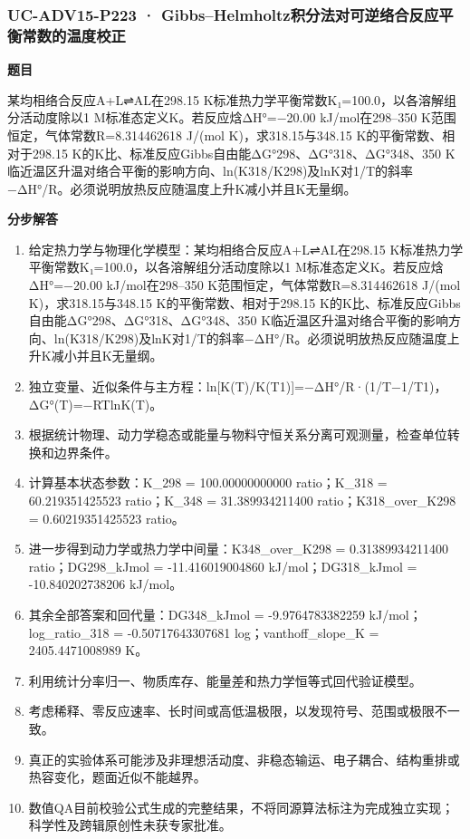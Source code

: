 \documentclass[UTF8,11pt,a4paper]{ctexart}
\begin{document}
\subsubsection*{UC-ADV15-P223 · Gibbs–Helmholtz积分法对可逆络合反应平衡常数的温度校正}
\noindent\textbf{题目}\par
某均相络合反应A+L⇌AL在298.15 K标准热力学平衡常数K₁=100.0，以各溶解组分活动度除以1 M标准态定义K。若反应焓ΔH°=−20.00 kJ/mol在298–350 K范围恒定，气体常数R=8.314462618 J/(mol K)，求318.15与348.15 K的平衡常数、相对于298.15 K的K比、标准反应Gibbs自由能ΔG°298、ΔG°318、ΔG°348、350 K临近温区升温对络合平衡的影响方向、ln(K318/K298)及lnK对1/T的斜率−ΔH°/R。必须说明放热反应随温度上升K减小并且K无量纲。\par
\medskip\noindent\textbf{分步解答}
\begin{enumerate}
\item 给定热力学与物理化学模型：某均相络合反应A+L⇌AL在298.15 K标准热力学平衡常数K₁=100.0，以各溶解组分活动度除以1 M标准态定义K。若反应焓ΔH°=−20.00 kJ/mol在298–350 K范围恒定，气体常数R=8.314462618 J/(mol K)，求318.15与348.15 K的平衡常数、相对于298.15 K的K比、标准反应Gibbs自由能ΔG°298、ΔG°318、ΔG°348、350 K临近温区升温对络合平衡的影响方向、ln(K318/K298)及lnK对1/T的斜率−ΔH°/R。必须说明放热反应随温度上升K减小并且K无量纲。
\item 独立变量、近似条件与主方程：ln[K(T)/K(T1)]=−ΔH°/R·(1/T−1/T1)，ΔG°(T)=−RTlnK(T)。
\item 根据统计物理、动力学稳态或能量与物料守恒关系分离可观测量，检查单位转换和边界条件。
\item 计算基本状态参数：K\_298 = 100.00000000000 ratio；K\_318 = 60.219351425523 ratio；K\_348 = 31.389934211400 ratio；K318\_over\_K298 = 0.60219351425523 ratio。
\item 进一步得到动力学或热力学中间量：K348\_over\_K298 = 0.31389934211400 ratio；DG298\_kJmol = -11.416019004860 kJ/mol；DG318\_kJmol = -10.840202738206 kJ/mol。
\item 其余全部答案和回代量：DG348\_kJmol = -9.9764783382259 kJ/mol；log\_ratio\_318 = -0.50717643307681 log；vanthoff\_slope\_K = 2405.4471008989 K。
\item 利用统计分率归一、物质库存、能量差和热力学恒等式回代验证模型。
\item 考虑稀释、零反应速率、长时间或高低温极限，以发现符号、范围或极限不一致。
\item 真正的实验体系可能涉及非理想活动度、非稳态输运、电子耦合、结构重排或热容变化，题面近似不能越界。
\item 数值QA目前校验公式生成的完整结果，不将同源算法标注为完成独立实现；科学性及跨辑原创性未获专家批准。
\end{enumerate}
\end{document}
